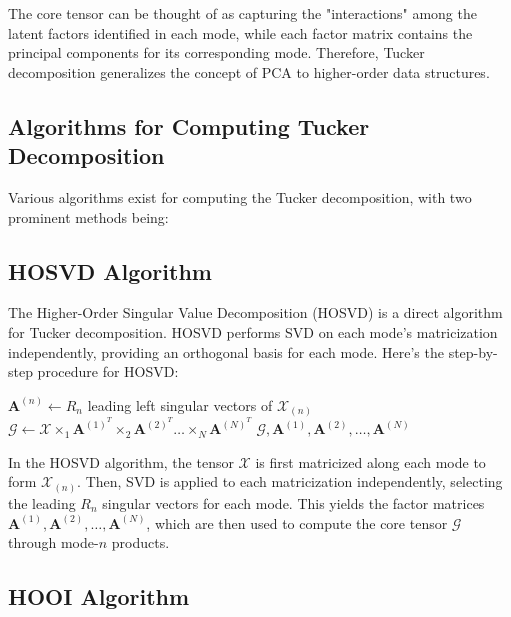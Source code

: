 \documentclass[a4paper,14pt]{article}
\theoremstyle{plain} %
\theoremstyle{definition} %
\theoremstyle{remark} %
\theoremstyle{definition}
\theoremstyle{remark}
\theoremstyle{remark}
\begin{document}
	The core tensor can be thought of as capturing the "interactions" among the latent factors identified in each mode, while each factor matrix contains the principal components for its corresponding mode. Therefore, Tucker decomposition generalizes the concept of PCA to higher-order data structures.
	
	\subsection{Algorithms for Computing Tucker Decomposition}
	
	Various algorithms exist for computing the Tucker decomposition, with two prominent methods being:
	
	\subsection{HOSVD Algorithm}
	
	The Higher-Order Singular Value Decomposition (HOSVD) is a direct algorithm for Tucker decomposition. HOSVD performs SVD on each mode's matricization independently, providing an orthogonal basis for each mode. Here’s the step-by-step procedure for HOSVD:
	
	\begin{algorithm}
		\caption{HOSVD}
		\label{alg:HOSVD}
		\begin{algorithmic}
			\State $\mathbf{A}^{(n)} \leftarrow R_n$ leading left singular vectors of $\mathcal{X}_{(n)}$
			\EndFor
			\State $\mathcal{G} \leftarrow \mathcal{X} \times_1 \mathbf{A}^{(1)^T} \times_2 \mathbf{A}^{(2)^T} \dots \times_N \mathbf{A}^{(N)^T}$
			\State \Return $\mathcal{G}, \mathbf{A}^{(1)}, \mathbf{A}^{(2)}, \dots, \mathbf{A}^{(N)}$
			\EndProcedure
		\end{algorithmic}
	\end{algorithm}
	
	In the HOSVD algorithm, the tensor \(\mathcal{X}\) is first matricized along each mode to form \(\mathcal{X}_{(n)}\). Then, SVD is applied to each matricization independently, selecting the leading \(R_n\) singular vectors for each mode. This yields the factor matrices \(\mathbf{A}^{(1)}, \mathbf{A}^{(2)}, \dots, \mathbf{A}^{(N)}\), which are then used to compute the core tensor \(\mathcal{G}\) through mode-\(n\) products.
	
	\subsection{HOOI Algorithm}
	
\end{document}
